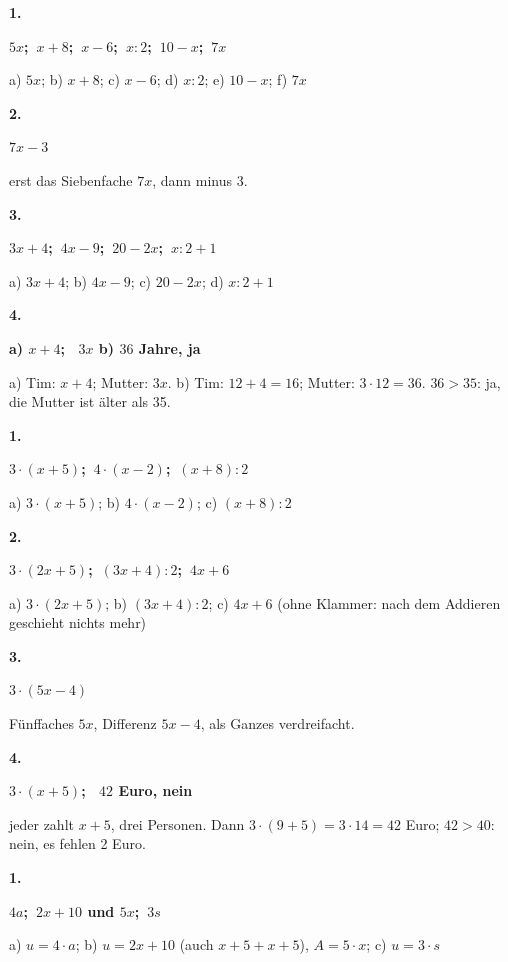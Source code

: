 \documentclass[11pt]{article}
\newcommand{\lsg}[3]{\par\noindent\begin{minipage}[t]{9mm}\textbf{#1}\end{minipage}%
  \begin{minipage}[t]{52mm}\raggedright\bfseries\boldmath #2\end{minipage}\hspace{3mm}%
  \begin{minipage}[t]{\dimexpr\linewidth-64mm\relax}\raggedright\small #3\end{minipage}\par\vspace{4pt}}
\begin{document}
\par\smallskip
{}\par
\par\Needspace{25mm}\vspace{6pt}\noindent\colorbox{black!12}{}\hspace{2mm}{\bfseries Rechenwörter in Terme übersetzen}\par\vspace{4pt}
\lsg{1.}{$5x$;\ $x + 8$;\ $x - 6$;\ $x : 2$;\ $10 - x$;\ $7x$}{a) $5x$; b) $x + 8$; c) $x - 6$; d) $x : 2$; e) $10 - x$; f) $7x$}
\lsg{2.}{$7x - 3$}{erst das Siebenfache $7x$, dann minus 3.}
\lsg{3.}{$3x + 4$;\ $4x - 9$;\ $20 - 2x$;\ $x : 2 + 1$}{a) $3x + 4$; b) $4x - 9$; c) $20 - 2x$; d) $x : 2 + 1$}
\lsg{4.}{a) $x + 4$; \ $3x$ \quad b) $36$ Jahre, ja}{a) Tim: $x + 4$; Mutter: $3x$. b) Tim: $12 + 4 = 16$; Mutter: $3 \cdot 12 = 36$. $36 > 35$: ja, die Mutter ist älter als 35.}
\par\Needspace{25mm}\vspace{6pt}\noindent\colorbox{black!12}{}\hspace{2mm}{\bfseries Klammer, wenn ein Ergebnis weiterverarbeitet wird}\par\vspace{4pt}
\lsg{1.}{$3 \cdot (x + 5)$;\ $4 \cdot (x - 2)$;\ $(x + 8) : 2$}{a) $3 \cdot (x + 5)$; b) $4 \cdot (x - 2)$; c) $(x + 8) : 2$}
\lsg{2.}{$3 \cdot (2x + 5)$;\ $(3x + 4) : 2$;\ $4x + 6$}{a) $3 \cdot (2x + 5)$; b) $(3x + 4) : 2$; c) $4x + 6$ (ohne Klammer: nach dem Addieren geschieht nichts mehr)}
\lsg{3.}{$3 \cdot (5x - 4)$}{Fünffaches $5x$, Differenz $5x - 4$, als Ganzes verdreifacht.}
\lsg{4.}{$3 \cdot (x + 5)$; \ $42$ Euro, nein}{jeder zahlt $x + 5$, drei Personen. Dann $3 \cdot (9 + 5) = 3 \cdot 14 = 42$ Euro; $42 > 40$: nein, es fehlen 2 Euro.}
\par\Needspace{25mm}\vspace{6pt}\noindent\colorbox{black!12}{}\hspace{2mm}{\bfseries Term zur Figur: Umfang und Flächeninhalt}\par\vspace{4pt}
\lsg{1.}{$4a$;\ $2x + 10$ und $5x$;\ $3s$}{a) $u = 4 \cdot a$; b) $u = 2x + 10$ (auch $x + 5 + x + 5$), $A = 5 \cdot x$; c) $u = 3 \cdot s$}
\end{document}
